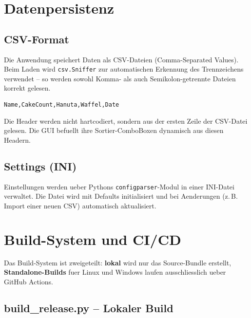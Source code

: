 \documentclass[12pt, a4paper]{article}
\begin{document}
\section{Datenpersistenz}

\subsection{CSV-Format}

Die Anwendung speichert Daten als CSV-Dateien (Comma-Separated Values).
Beim Laden wird \texttt{csv.Sniffer} zur automatischen Erkennung des
Trennzeichens verwendet -- so werden sowohl Komma- als auch
Semikolon-getrennte Dateien korrekt gelesen.

\begin{lstlisting}[language={}, caption={StandardCakeData.csv -- Header-Vorlage}]
Name,CakeCount,Hanuta,Waffel,Date
\end{lstlisting}

\begin{infobox}
Die Header werden nicht hartcodiert, sondern aus der ersten Zeile der CSV-Datei
gelesen. Die GUI befuellt ihre Sortier-ComboBoxen dynamisch aus diesen
Headern.
\end{infobox}

\subsection{Settings (INI)}

Einstellungen werden ueber Pythons \texttt{configparser}-Modul in einer
INI-Datei verwaltet. Die Datei wird mit Defaults initialisiert und bei
Aenderungen (z.\,B. Import einer neuen CSV) automatisch aktualisiert.


\section{Build-System und CI/CD}

Das Build-System ist zweigeteilt: \textbf{lokal} wird nur das Source-Bundle
erstellt, \textbf{Standalone-Builds} fuer Linux und Windows laufen
ausschliesslich ueber GitHub Actions.

\subsection{build\_release.py -- Lokaler Build}
\end{document}
